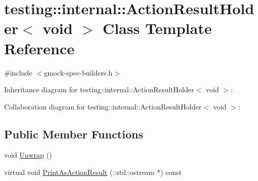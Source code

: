 \hypertarget{classtesting_1_1internal_1_1_action_result_holder_3_01void_01_4}{}\section{testing\+:\+:internal\+:\+:Action\+Result\+Holder$<$ void $>$ Class Template Reference}
\label{classtesting_1_1internal_1_1_action_result_holder_3_01void_01_4}


{\ttfamily \#include $<$gmock-\/spec-\/builders.\+h$>$}



Inheritance diagram for testing\+:\+:internal\+:\+:Action\+Result\+Holder$<$ void $>$\+:


Collaboration diagram for testing\+:\+:internal\+:\+:Action\+Result\+Holder$<$ void $>$\+:
\subsection*{Public Member Functions}
\begin{DoxyCompactItemize}
\item 
void \hyperlink{classtesting_1_1internal_1_1_action_result_holder_3_01void_01_4_aa57f371e1559b236e6424b2f50dcd6a2}{Unwrap} ()
\item 
virtual void \hyperlink{classtesting_1_1internal_1_1_action_result_holder_3_01void_01_4_a6729c4fe6c33485ece4fbcfea8806e49}{Print\+As\+Action\+Result} (\+::std\+::ostream $\ast$) const 
\end{DoxyCompactItemize}
